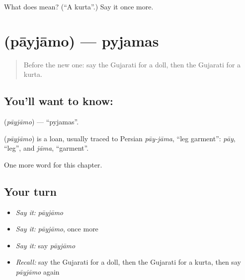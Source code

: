 \begin{tcolorbox}[breakable,colback=teal!4,colframe=teal!35!black,title={Before you move on}]
What does  mean? (\textquotedblleft{}A kurta\textquotedblright{}.) Say it once more.
\end{tcolorbox}
\section[\texorpdfstring{\gu{પાયજામો} (pāyjāmo)}{પાયજામો (pāyjāmo)}]{ (pāyjāmo) — pyjamas}

\label{lesson:GU-C111-payjamo}



\begin{quote}
Before the new one: say the Gujarati for a doll, then the Gujarati for a kurta.
\end{quote}

\subsection*{You'll want to know: }
\textbf{} (\emph{pāyjāmo}) — \textquotedblleft{}pyjamas\textquotedblright{}.

\begin{cousinweb}
\textbf{} (\emph{pāyjāmo}) is a loan, usually traced to Persian \emph{pāy-jāma}, \textquotedblleft{}leg garment\textquotedblright{}: \emph{pāy}, \textquotedblleft{}leg\textquotedblright{}, and \emph{jāma}, \textquotedblleft{}garment\textquotedblright{}.
\end{cousinweb}

\begin{grammarlens}[title={What you've built}]
One more word for this chapter.
\end{grammarlens}

\subsection*{Your turn}
\begin{itemize}
\raggedright
  \item \emph{Say it:} \emph{pāyjāmo}
  \item \emph{Say it:} \emph{pāyjāmo}, once more
  \item \emph{Say it:} say \emph{pāyjāmo}
  \item \emph{Recall:} say the Gujarati for a doll, then the Gujarati for a kurta, then say \emph{pāyjāmo} again
\end{itemize}

